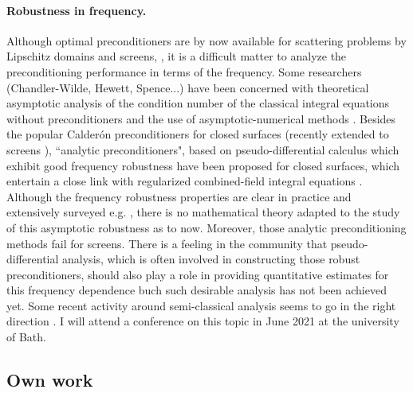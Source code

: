 \documentclass[]{report}
\begin{document}
\paragraph{Robustness in frequency.} Although optimal preconditioners are by now available
for scattering problems by Lipschitz domains and screens,
\cite{steinbach1998construction,hiptmair2006operator}, it is a difficult matter to analyze
the preconditioning performance in terms of the frequency. Some researchers
(Chandler-Wilde, Hewett, Spence...) have been concerned with theoretical asymptotic
analysis of the condition number of the classical integral equations without
preconditioners \cite{chandler2020high} and the use of asymptotic-numerical methods
\cite{chandlerWilde2015high}. Besides the popular Calder\'{o}n preconditioners
\cite{christiansen2000preconditionneurs,christiansen2002preconditioner} for closed
surfaces (recently extended to screens \cite{bruno2012second}), ``analytic
preconditioners", based on pseudo-differential calculus which exhibit good frequency
robustness \cite{antoine2007generalized} have been proposed for closed surfaces, which
entertain a close link with regularized combined-field integral equations
\cite{buffa2005regularized}. Although the frequency robustness properties are clear in
practice and extensively surveyed e.g. \cite{boubendir2014well}, there is no mathematical
theory adapted to the study of this asymptotic robustness as to now. Moreover, those
analytic preconditioning methods fail for screens. There is a feeling in the community
that pseudo-differential analysis, which is often involved in constructing those robust
preconditioners, should also play a role in providing quantitative estimates for this
frequency dependence buch such desirable analysis has not been achieved yet. Some recent
activity around semi-classical analysis seems to go in the right direction
\cite{galkowski2019wavenumber}. I will attend a conference on this topic in June 2021 at
the university of Bath.


\subsection*{Own work}
\end{document}
